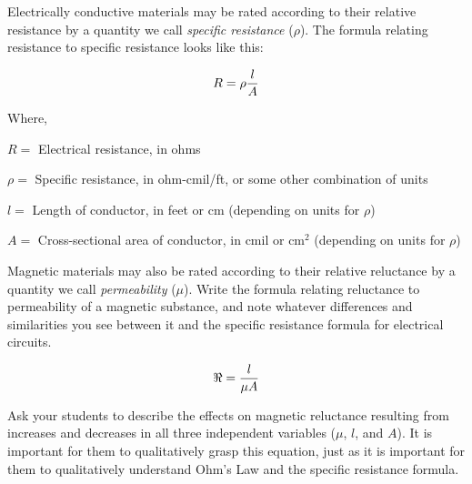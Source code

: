 

Electrically conductive materials may be rated according to their relative resistance by a quantity we call {\it specific resistance} ($\rho$).  The formula relating resistance to specific resistance looks like this:

$$R = \rho{l \over A}$$

\noindent
Where,

$R =$ Electrical resistance, in ohms

$\rho =$ Specific resistance, in ohm-cmil/ft, or some other combination of units

$l =$ Length of conductor, in feet or cm (depending on units for $\rho$)

$A =$ Cross-sectional area of conductor, in cmil or cm$^{2}$ (depending on units for $\rho$)

\vskip 10pt

Magnetic materials may also be rated according to their relative reluctance by a quantity we call {\it permeability} ($\mu$).  Write the formula relating reluctance to permeability of a magnetic substance, and note whatever differences and similarities you see between it and the specific resistance formula for electrical circuits.







$$\Re = {l \over {\mu A}}$$







Ask your students to describe the effects on magnetic reluctance resulting from increases and decreases in all three independent variables ($\mu$, $l$, and $A$).  It is important for them to qualitatively grasp this equation, just as it is important for them to qualitatively understand Ohm's Law and the specific resistance formula.





